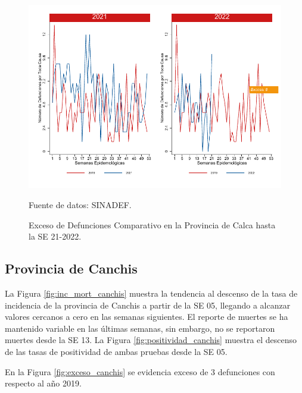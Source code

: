 \documentclass[12pt,a4paper,openany]{book}
\begin{document}
	\begin{figure}[h]
		\caption{Exceso de Defunciones Comparativo en la Provincia de Calca hasta la SE 21-2022.}\label{fig:exceso_calca}
		\begin{center}
			\includegraphics[width=0.7\linewidth]{../figuras/exceso_4.pdf}
		\end{center}
		{\footnotesize {Fuente de datos: SINADEF.}}
	\end{figure}
	
	\clearpage
	
	\subsection*{Provincia de Canchis}
	\noindent La Figura \ref{fig:inc_mort_canchis} muestra la tendencia al descenso de la tasa de incidencia de la provincia de Canchis a partir de la SE 05,  llegando a alcanzar valores cercanos a cero en las semanas siguientes. El reporte de muertes se ha mantenido variable en las últimas semanas, sin embargo, no se reportaron muertes desde la SE 13.    
	\noindent La Figura \ref{fig:positividad_canchis} muestra el descenso de las tasas de positividad de ambas pruebas desde la SE 05.
	
	En la Figura \ref{fig:exceso_canchis} se evidencia exceso de 3 defunciones con respecto al año 2019.
	
\end{document}
